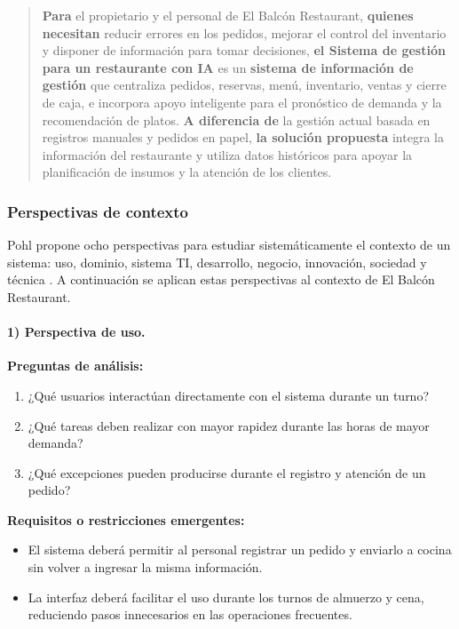 \begin{quote}
\textbf{Para} el propietario y el personal de El Balcón Restaurant,
\textbf{quienes necesitan} reducir errores en los pedidos, mejorar el control
del inventario y disponer de información para tomar decisiones,
\textbf{el Sistema de gestión para un restaurante con IA} es un
\textbf{sistema de información de gestión} que centraliza pedidos, reservas,
menú, inventario, ventas y cierre de caja, e incorpora apoyo inteligente para
el pronóstico de demanda y la recomendación de platos.
\textbf{A diferencia de} la gestión actual basada en registros manuales y
pedidos en papel, \textbf{la solución propuesta} integra la información del
restaurante y utiliza datos históricos para apoyar la planificación de
insumos y la atención de los clientes.
\end{quote}

\subsubsection{Perspectivas de contexto}

Pohl propone ocho perspectivas para estudiar sistemáticamente el contexto de
un sistema: uso, dominio, sistema TI, desarrollo, negocio, innovación,
sociedad y técnica \cite{pohl2025}. A continuación se aplican estas
perspectivas al contexto de El Balcón Restaurant.

\paragraph{1) Perspectiva de uso.}

\textbf{Preguntas de análisis:}
\begin{enumerate}
    \item ¿Qué usuarios interactúan directamente con el sistema durante un turno?
    \item ¿Qué tareas deben realizar con mayor rapidez durante las horas de mayor demanda?
    \item ¿Qué excepciones pueden producirse durante el registro y atención de un pedido?
\end{enumerate}

\textbf{Requisitos o restricciones emergentes:}
\begin{itemize}
    \item El sistema deberá permitir al personal registrar un pedido y enviarlo
    a cocina sin volver a ingresar la misma información.
    \item La interfaz deberá facilitar el uso durante los turnos de almuerzo y
    cena, reduciendo pasos innecesarios en las operaciones frecuentes.
\end{itemize}

